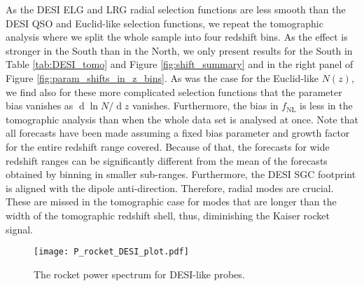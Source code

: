 \documentclass[a4paper,11pt]{article}
\renewcommand{\d}{\operatorname{d}}
\begin{document}
As the DESI ELG and LRG radial selection functions are less smooth than the DESI QSO and Euclid-like selection functions, we repeat the tomographic analysis where we split the whole sample into four redshift bins. As the effect is stronger in the South than in the North, we only present results for the South in Table \ref{tab:DESI_tomo} and Figure \ref{fig:shift_summary} and in the right panel of Figure \ref{fig:param_shifts_in_z_bins}. As was the case for the Euclid-like $N(z)$, we find also for these more complicated selection functions that the parameter bias vanishes as $\d\ln N/\d z$ vanishes. Furthermore, the bias in $f_\mathrm{NL}$ is less in the tomographic analysis than when the whole data set is analysed at once. 
Note that all forecasts have  been  made  assuming  a  fixed  bias  parameter  and  growth  factor  for  the  entire  redshift  range  covered. Because  of  that,  the  forecasts  for  wide  redshift  ranges  can  be  significantly  different  from  the  mean  of  the forecasts obtained by binning in smaller sub-ranges. Furthermore, the DESI SGC footprint is aligned with the dipole anti-direction. Therefore, radial modes are crucial. These are missed in the tomographic case for modes that are longer than the width of the tomographic redshift shell, thus, diminishing the Kaiser rocket signal.

\begin{figure}
    \centering
    \texttt{[image: P\_rocket\_DESI\_plot.pdf]}
    \caption{The rocket power spectrum for DESI-like probes.}
    \label{fig:P_DESI}
\end{figure}
\end{document}
